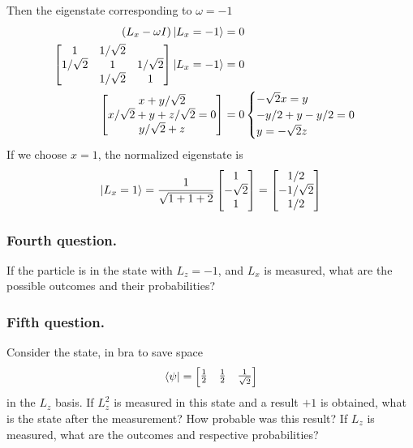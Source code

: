 \documentclass[../../../main.tex]{subfiles}
\begin{document}
Then the eigenstate corresponding to $\omega=-1$
\begin{align*}
    \left( L_x -\omega I  \right) \ket{L_x=-1}&= 0\\
    \begin{bmatrix}
        1& 1/\sqrt{2 }& \\
        1/\sqrt{2}&1 &1/\sqrt{2} \\
        & 1/\sqrt{2}&1 \\
    \end{bmatrix}
    \ket{L_x=-1}&= 0\\
    \begin{bmatrix}
        x+y/\sqrt{2}\\
        x/\sqrt{2 }+y+z/\sqrt{2}=0\\
        y/\sqrt{2 }+z\\
    \end{bmatrix}
    &= 0
    \begin{cases}
        - \sqrt{2}x=y\\
        -y/2+y-y/2=0\\
        y=-\sqrt{2}z\\
    \end{cases}
\end{align*}
If we choose $x=1$, the normalized eigenstate is
\begin{equation*}
    \ket{L_x=1}=
    \frac{1}{\sqrt{1+1+2}}
    \begin{bmatrix}
        1\\
        -\sqrt{2}\\
        1\\
    \end{bmatrix}
    =
        \begin{bmatrix}
        1/2\\
        -1/\sqrt{2}\\
        1/2\\
    \end{bmatrix}
\end{equation*}

\subsubsection{Fourth question.}
If the particle is in the state with $L_z = -1$, and $L_x$ is measured, what are the possible outcomes and their probabilities?

\subsubsection{Fifth question.}
Consider the state, in bra to save space 
\begin{equation*}
    \bra{\psi}=\begin{bmatrix}
        \frac{1 }{2}&\frac{1 }{2}&\frac{1 }{\sqrt{2}}
    \end{bmatrix}
\end{equation*}
in the $L_z$ basis.
If $L_z^2$ is measured in this state and a result $+1$ is obtained, what is the state after the measurement? 
How probable was this result? 
If $L_z$ is measured, what are the outcomes and respective probabilities?
\end{document}
